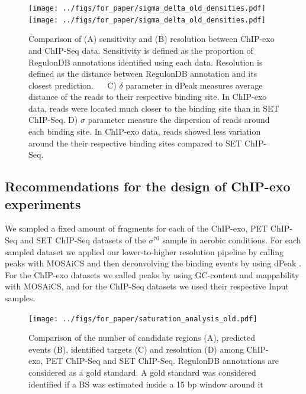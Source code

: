 \documentclass[11pt]{article}\usepackage[]{graphicx}\usepackage[]{color}
\begin{document}
\begin{figure}[H]
\centering
   \texttt{[image: ../figs/for\_paper/sigma\_delta\_old\_densities.pdf]}
   \texttt{[image: ../figs/for\_paper/sigma\_delta\_old\_densities.pdf]} 

   \caption{Comparison of (A) sensitivity and (B) resolution between
     ChIP-exo and ChIP-Seq data. Sensitivity is defined as the
     proportion of RegulonDB annotations identified using each
     data. Resolution is defined as the distance between RegulonDB
     annotation and its closest prediction. $\quad$ C) $\delta$ parameter in
     dPeak measures average distance of the reads to their respective
     binding site. In ChIP-exo data, reads were located much closer to
     the binding site than in SET ChIP-Seq. D) $\sigma$ parameter
     measure the dispersion of reads around each binding site. In
     ChIP-exo data, reads showed less variation around the their
     respective binding sites compared to SET ChIP-Seq.}
  \label{fig:reso_all}
\end{figure}

\subsection{Recommendations for the design of ChIP-exo experiments}
\label{sec:reco}



We sampled a fixed amount of fragments for each of the ChIP-exo, PET
ChIP-Seq and SET ChIP-Seq datasets of the $\sigma^{70}$ sample in
aerobic conditions. For each sampled dataset we applied our
lower-to-higher resolution pipeline by calling peaks with MOSAiCS
\cite{mosaics} and then deconvolving the binding events by using dPeak
\cite{dpeak}. For the ChIP-exo datasets we called peaks by using
GC-content and mappability with MOSAiCS, and for the ChIP-Seq datasets
we used their respective Input samples.

\begin{figure}[H]
  \centering
  \texttt{[image: ../figs/for\_paper/saturation\_analysis\_old.pdf]}
  \caption{Comparison of the number of candidate regions (A),
    predicted events (B), identified targets (C) and resolution (D)
    among ChIP-exo, PET ChIP-Seq and SET ChIP-Seq. RegulonDB
    annotations are considered as a gold standard. A gold standard was
    considered identified if a BS was estimated inside a 15
    bp window around it}
  \label{fig:design}
\end{figure}
\end{document}
